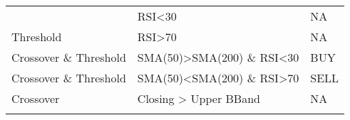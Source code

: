 \documentclass[
  11pt,
]{article}
\begin{document}
\begin{longtable}[]{@{}lll@{}}
\begin{minipage}[t]{0.30\columnwidth}
\end{minipage} & \begin{minipage}[t]{0.42\columnwidth}\raggedright
RSI\textless30\strut
\end{minipage} & \begin{minipage}[t]{0.15\columnwidth}\raggedright
NA\strut
\end{minipage}\tabularnewline
\begin{minipage}[t]{0.30\columnwidth}\raggedright
Threshold\strut
\end{minipage} & \begin{minipage}[t]{0.42\columnwidth}\raggedright
RSI\textgreater70\strut
\end{minipage} & \begin{minipage}[t]{0.15\columnwidth}\raggedright
NA\strut
\end{minipage}\tabularnewline
\begin{minipage}[t]{0.30\columnwidth}\raggedright
Crossover \& Threshold\strut
\end{minipage} & \begin{minipage}[t]{0.42\columnwidth}\raggedright
SMA(50)\textgreater SMA(200) \& RSI\textless30\strut
\end{minipage} & \begin{minipage}[t]{0.15\columnwidth}\raggedright
BUY\strut
\end{minipage}\tabularnewline
\begin{minipage}[t]{0.30\columnwidth}\raggedright
Crossover \& Threshold\strut
\end{minipage} & \begin{minipage}[t]{0.42\columnwidth}\raggedright
SMA(50)\textless SMA(200) \& RSI\textgreater70\strut
\end{minipage} & \begin{minipage}[t]{0.15\columnwidth}\raggedright
SELL\strut
\end{minipage}\tabularnewline
\begin{minipage}[t]{0.30\columnwidth}\raggedright
Crossover\strut
\end{minipage} & \begin{minipage}[t]{0.42\columnwidth}\raggedright
Closing \textgreater{} Upper BBand\strut
\end{minipage} & \begin{minipage}[t]{0.15\columnwidth}\raggedright
NA\strut
\end{minipage}\tabularnewline
\begin{minipage}[t]{0.30\columnwidth}\raggedright

\end{minipage}
\end{longtable}
\end{document}
